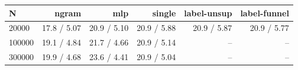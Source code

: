 \begin{tabular}{@{}lrrrrr@{}}\toprule
N & ngram & mlp & single & label-unsup & label-funnel\\\midrule
20000 & 17.8 / 5.07 & 20.9 / 5.10 & 20.9 / 5.88 & 20.9 / 5.87 & 20.9 / 5.77\\
100000 & 19.1 / 4.84 & 21.7 / 4.66 & 20.9 / 5.14 & -- & --\\
300000 & 19.9 / 4.68 & 23.6 / 4.41 & 20.9 / 5.04 & -- & --\\
\bottomrule\end{tabular}